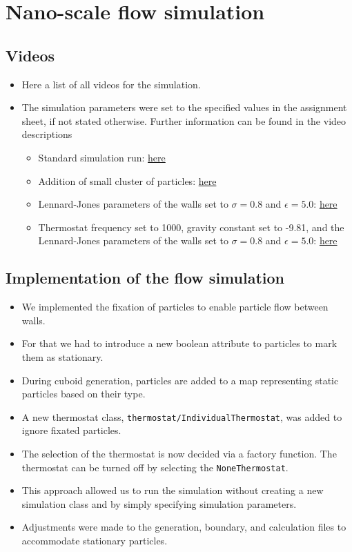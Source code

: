 \documentclass{article}
\begin{document}
\section{Nano-scale flow simulation}
\label{sec:nano}

\subsection{Videos}
\label{subsec:vidnano}

    \begin{itemize}
        \item Here a list of all videos for the simulation.
        \item The simulation parameters were set to the specified values in the assignment sheet, if not stated otherwise. Further information can be found in the video descriptions
        \begin{itemize}
            \item Standard simulation run: \href{https://youtu.be/-eWISjhgIgA}{here}
            \item Addition of small cluster of particles: \href{https://youtu.be/G34H3SCnpW0}{here}
            \item Lennard-Jones parameters of the walls set to $\sigma = 0.8$ and $\epsilon = 5.0$: \href{https://youtu.be/I4h6tjnJVuI}{here}
            \item Thermostat frequency set to 1000, gravity constant set to -9.81, and the Lennard-Jones parameters of the walls set to $\sigma = 0.8$ and $\epsilon = 5.0$: \href{https://youtu.be/yxNYmXJg5r0}{here}
        \end{itemize}
    \end{itemize}

\subsection{Implementation of the flow simulation}
\label{subsec:wall}

    \begin{itemize}
        \item We implemented the fixation of particles to enable particle flow between walls.
        \item For that we had to introduce a new boolean attribute to particles to mark them as stationary.
        \item During cuboid generation, particles are added to a map representing static particles based on their type.
        \item A new thermostat class, \texttt{thermostat/IndividualThermostat}, was added to ignore fixated particles.
        \item The selection of the thermostat is now decided via a factory function. The thermostat can be turned off by selecting the \texttt{NoneThermostat}.
        \item This approach allowed us to run the simulation without creating a new simulation class and by simply specifying simulation parameters.
        \item Adjustments were made to the generation, boundary, and calculation files to accommodate stationary particles.
    \end{itemize}
\end{document}

